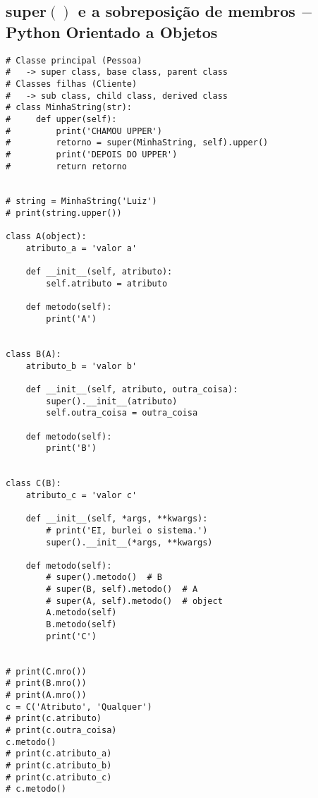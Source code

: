 \documentclass{article}
\begin{document}
\subsection{super$()$ e a sobreposição de membros $-$ Python Orientado a Objetos}
\begin{lstlisting}   
# Classe principal (Pessoa)
#   -> super class, base class, parent class
# Classes filhas (Cliente)
#   -> sub class, child class, derived class
# class MinhaString(str):
#     def upper(self):
#         print('CHAMOU UPPER')
#         retorno = super(MinhaString, self).upper()
#         print('DEPOIS DO UPPER')
#         return retorno


# string = MinhaString('Luiz')
# print(string.upper())

class A(object):
    atributo_a = 'valor a'

    def __init__(self, atributo):
        self.atributo = atributo

    def metodo(self):
        print('A')


class B(A):
    atributo_b = 'valor b'

    def __init__(self, atributo, outra_coisa):
        super().__init__(atributo)
        self.outra_coisa = outra_coisa

    def metodo(self):
        print('B')


class C(B):
    atributo_c = 'valor c'

    def __init__(self, *args, **kwargs):
        # print('EI, burlei o sistema.')
        super().__init__(*args, **kwargs)

    def metodo(self):
        # super().metodo()  # B
        # super(B, self).metodo()  # A
        # super(A, self).metodo()  # object
        A.metodo(self)
        B.metodo(self)
        print('C')


# print(C.mro())
# print(B.mro())
# print(A.mro())
c = C('Atributo', 'Qualquer')
# print(c.atributo)
# print(c.outra_coisa)
c.metodo()
# print(c.atributo_a)
# print(c.atributo_b)
# print(c.atributo_c)
# c.metodo()
    
\end{lstlisting}
\end{document}
